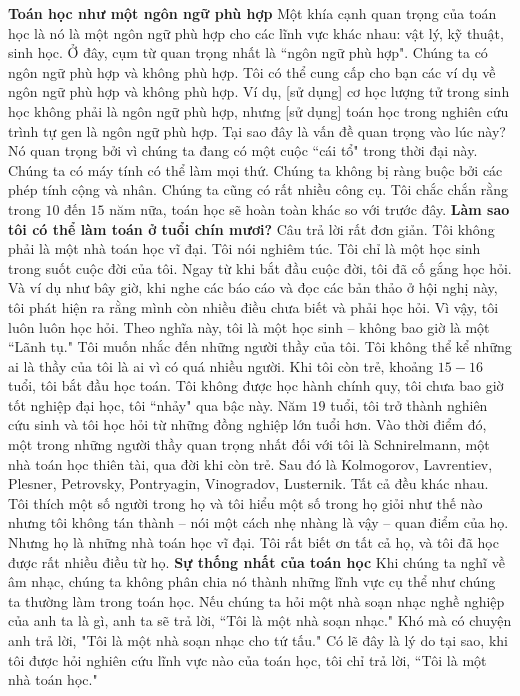 \begin{multicols}{2}
	\vskip 0.1cm
	\textbf{\color{quantoan}Toán học như một ngôn ngữ phù hợp}
	\vskip 0.1cm
	Một khía cạnh quan trọng của toán học là nó là một ngôn ngữ phù hợp cho các lĩnh vực khác nhau: vật lý, kỹ thuật, sinh học. Ở đây, cụm từ quan trọng nhất là ``ngôn ngữ phù hợp". Chúng ta có ngôn ngữ phù hợp và không phù hợp. Tôi có thể cung cấp cho bạn các ví dụ về ngôn ngữ phù hợp và không phù hợp. Ví dụ, [sử dụng] cơ học lượng tử trong sinh học không phải là ngôn ngữ phù hợp, nhưng [sử dụng] toán học trong nghiên cứu trình tự gen là ngôn ngữ phù hợp.  
	\vskip 0.1cm
	Tại sao đây là vấn đề quan trọng vào lúc này? Nó quan trọng bởi vì chúng ta đang có một cuộc ``cái tổ" trong thời đại này. Chúng ta có máy tính có thể làm mọi thứ. Chúng ta không bị ràng buộc bởi các phép tính cộng và nhân. Chúng ta cũng có rất nhiều công cụ. Tôi chắc chắn rằng trong $10$ đến $15$ năm nữa, toán học sẽ hoàn toàn khác so với trước đây.
	\vskip 0.1cm
	\textbf{\color{quantoan}Làm sao tôi có thể làm toán ở tuổi chín mươi?}
	\vskip 0.05cm
	Câu trả lời rất đơn giản. Tôi không phải là một nhà toán học vĩ đại. Tôi nói nghiêm túc. Tôi chỉ là một học sinh trong suốt cuộc đời của tôi. Ngay từ khi bắt đầu cuộc đời, tôi đã cố gắng học hỏi. Và ví dụ như bây giờ, khi nghe các báo cáo và đọc các bản thảo ở hội nghị này, tôi phát hiện ra rằng mình còn nhiều điều chưa biết và phải học hỏi. Vì vậy, tôi luôn luôn học hỏi. Theo nghĩa này, tôi là một học sinh -- không bao giờ là một \linebreak ``Lãnh tụ."
	\vskip 0.05cm
	Tôi muốn nhắc đến những người thầy của tôi. Tôi không thể kể những ai là thầy của tôi là ai vì có quá nhiều người. Khi tôi còn trẻ, khoảng $15-16$ tuổi, tôi bắt đầu học toán. Tôi không được học hành chính quy, tôi chưa bao giờ tốt nghiệp đại học, tôi ``nhảy" qua bậc này. Năm $19$ tuổi, tôi trở thành nghiên cứu sinh và tôi học hỏi từ những đồng nghiệp lớn tuổi hơn.
	\vskip 0.05cm
	Vào thời điểm đó, một trong những người thầy quan trọng nhất đối với tôi là Schnirelmann, một nhà toán học thiên tài, qua đời khi còn trẻ. Sau đó là Kolmogorov, Lavrentiev, Plesner, Petrovsky, Pontryagin, Vinogradov, Lusternik. Tất cả đều khác nhau. Tôi thích một số người trong họ và tôi hiểu một số trong họ giỏi như thế nào nhưng tôi không tán thành -- nói một cách nhẹ nhàng là vậy -- quan điểm của họ. Nhưng họ là những nhà toán học vĩ đại. Tôi rất biết ơn tất cả họ, và tôi đã học được rất nhiều điều từ họ.
	\vskip 0.05cm
	\textbf{\color{quantoan}Sự thống nhất của toán học}
	\vskip 0.05cm
	Khi chúng ta nghĩ về âm nhạc, chúng ta không phân chia nó thành những lĩnh vực cụ thể như chúng ta thường làm trong toán học. Nếu chúng ta hỏi một nhà soạn nhạc nghề nghiệp của anh ta là gì, anh ta sẽ trả lời, ``Tôi là một nhà soạn nhạc." Khó mà có chuyện anh trả lời, "Tôi là một nhà soạn nhạc cho tứ tấu." Có lẽ đây là lý do tại sao, khi tôi được hỏi nghiên cứu lĩnh vực nào của toán học, tôi chỉ trả lời, ``Tôi là một nhà toán học."

\end{multicols}
